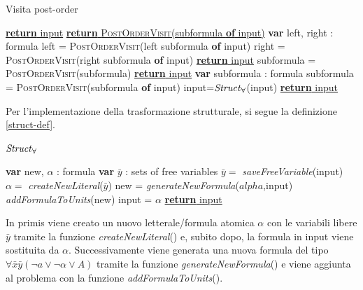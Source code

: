 \begin{algorithm}[H]
    \caption{Visita post-order}
    \begin{algorithmic}
                    \State \underline{\textbf{return} input}
                \EndSwitch
                \Switch{$\lnot,\exists$}
                    \State \underline{\textbf{return} \textsc{PostOrderVisit}(subformula \textbf{of} input)}
                \EndSwitch
                \Switch{$\rightarrow,\leftrightarrow$}
                    \State \textbf{var} left, right : formula
                    \State left = \textsc{PostOrderVisit}(left subformula \textbf{of} input)
                    \State right = \textsc{PostOrderVisit}(right subformula \textbf{of} input) 
                    \State \underline{\textbf{return} input}
                \EndSwitch
                \Switch{$\land,\lor$}
                        \State subformula = \textsc{PostOrderVisit}(subformula)
                    \EndFor
                    \State \underline{\textbf{return} input} 
                \EndSwitch
                \Switch{$\forall$}
                    \State \textbf{var} subformula : formula
                    \State subformula = \textsc{PostOrderVisit}(subformula \textbf{of} input)
                        \State  input=$\text{\emph{Struct}}_\forall$(input)
                    \EndIf
                    \State \underline{\textbf{return} input}
                \EndSwitch  
            \EndCase
        \EndFunction
    \end{algorithmic}
\end{algorithm}
Per l'implementazione della trasformazione strutturale, si segue la definizione \ref{struct-def}.
\begin{algorithm}[H]
    \caption{$\text{\emph{Struct}}_\forall$}
    \begin{algorithmic}
        \State \textbf{var} new, $\alpha$ : formula
        \State \textbf{var} $\bar{y}$ : sets of free variables 
        \State $\bar{y} =$ \emph{saveFreeVariable}(input)
        \State $\alpha =$ \emph{createNewLiteral}($\bar{y}$)
        \State new = \emph{generateNewFormula}($alpha$,input)
        \State \emph{addFormulaToUnits}(new)
        \State input = $\alpha$
        \State \underline{\textbf{return} input}
        \EndFunction
    \end{algorithmic}
\end{algorithm}
In primis viene creato un nuovo letterale/formula atomica $\alpha$ con le variabili libere $\bar{y}$
tramite la funzione \emph{createNewLiteral}() e, subito dopo, la formula in input viene sostituita da $\alpha$. Successivamente 
viene generata una nuova formula del tipo $\forall\bar{x}\bar{y}(\lnot a \lor \lnot\alpha \lor A)$ tramite la 
funzione \emph{generateNewFormula}() e viene aggiunta al problema con la funzione 
\emph{addFormulaToUnits}().

